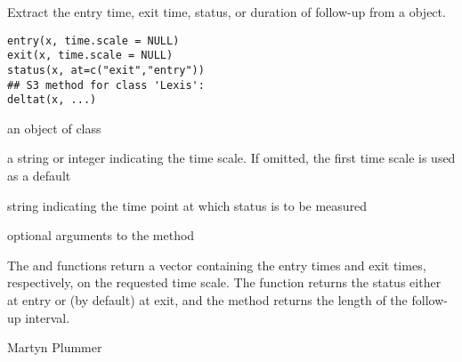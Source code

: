 \begin{Description}\relax
Extract the entry time, exit time, status, or duration of follow-up from a
 object.
\end{Description}
\begin{Usage}
\begin{verbatim}
entry(x, time.scale = NULL)
exit(x, time.scale = NULL)
status(x, at=c("exit","entry"))
## S3 method for class 'Lexis':
deltat(x, ...)
\end{verbatim}
\end{Usage}
\begin{Arguments}
\begin{ldescription}
\item[\code{x}] an object of class 
\item[\code{time.scale}] a string or integer indicating the time scale. If
omitted, the first time scale is used as a default
\item[\code{at}] string indicating the time point at which status is to be measured
\item[\code{...}] optional arguments to the  method
\end{ldescription}
\end{Arguments}
\begin{Value}
The  and  functions return a vector containing
the entry times and exit times, respectively, on the requested time
scale. The  function returns the status either at entry
or (by default) at exit, and the  method returns the length
of the follow-up interval.
\end{Value}
\begin{Author}\relax
Martyn Plummer
\end{Author}
\begin{SeeAlso}\relax
{}
\end{SeeAlso}

